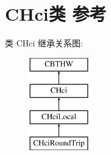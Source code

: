 \hypertarget{class_c_hci}{}\section{C\+Hci类 参考}
\label{class_c_hci}
类 C\+Hci 继承关系图\+:\begin{figure}[H]
\begin{center}
\leavevmode
\includegraphics[height=4.000000cm]{class_c_hci}
\end{center}
\end{figure}
